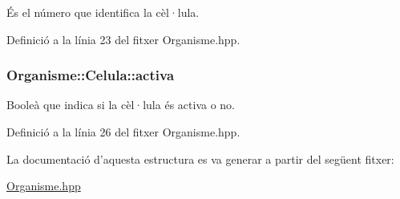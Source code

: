 És el número que identifica la cèl·lula. 



Definició a la línia 23 del fitxer Organisme.\-hpp.

\hypertarget{struct_organisme_1_1_celula_ae76b8fe2263311c1a52e4fba8f649114}{
\subsubsection[{activa}]{\setlength{\rightskip}{0pt plus 5cm}Organisme\-::\-Celula\-::activa}}\label{struct_organisme_1_1_celula_ae76b8fe2263311c1a52e4fba8f649114}


Booleà que indica si la cèl·lula és activa o no. 



Definició a la línia 26 del fitxer Organisme.\-hpp.



La documentació d'aquesta estructura es va generar a partir del següent fitxer\-:\begin{DoxyCompactItemize}
\item 
\hyperlink{_organisme_8hpp}{Organisme.\-hpp}\end{DoxyCompactItemize}
